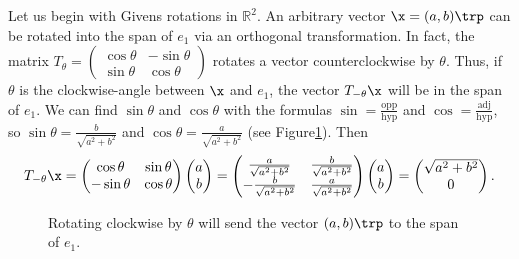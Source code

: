 Let us begin with Givens rotations in $\mathbb{R}^2$. 
An arbitrary vector $\x = (a, b)\trp$ can be rotated into the span of $e_1$ via an orthogonal transformation. 
In fact, the matrix $T_{\theta} = \begin{pmatrix}\cos \theta & - \sin \theta \\ \sin \theta & \cos \theta \end{pmatrix}$ rotates a vector counterclockwise by $\theta$.
Thus, if $\theta$ is the clockwise-angle between $\x$ and $e_1$, the vector $T_{-\theta}\x$ will be in the span of $e_1$.
We can find $\sin \theta$ and $\cos \theta$ with the formulas $\sin = \frac{\text{opp}}{\text{hyp}}$ and $\cos = \frac{\text{adj}}{\text{hyp}}$, so $\sin \theta = \frac{b}{\sqrt{a^2+b^2}}$ and $\cos \theta =  \frac{a}{\sqrt{a^2+b^2}}$ (see Figure\ref{fig:angle}).
Then 
\[
T_{-\theta}\x = \begin{pmatrix}\cos \theta &  \sin \theta \\ -\sin \theta & \cos \theta \end{pmatrix} \begin{pmatrix} a \\ b \end{pmatrix} = \begin{pmatrix}\frac{a}{\sqrt{a^2+b^2}} & \frac{b}{\sqrt{a^2+b^2}} \\ -\frac{b}{\sqrt{a^2+b^2}} & \frac{a}{\sqrt{a^2+b^2}} \end{pmatrix}\begin{pmatrix} a \\ b \end{pmatrix} = \begin{pmatrix} \sqrt{a^2+b^2} \\ 0 \end{pmatrix}.
\]

\begin{figure}
\begin{center}
\caption{Rotating clockwise by $\theta$ will send the vector $(a,b)\trp$ to the span of $e_1$.}
\label{fig:angle}
\end{center}
\end{figure}



